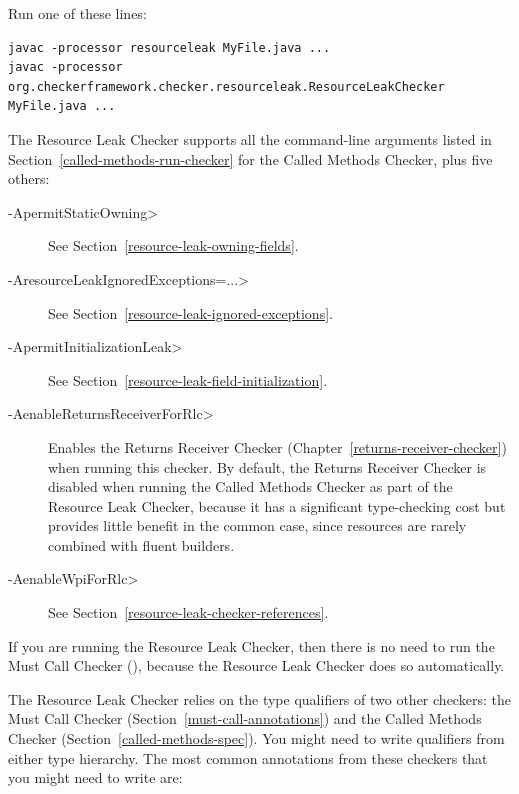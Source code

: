 
Run one of these lines:

\begin{Verbatim}
javac -processor resourceleak MyFile.java ...
javac -processor org.checkerframework.checker.resourceleak.ResourceLeakChecker MyFile.java ...
\end{Verbatim}

The Resource Leak Checker supports all the command-line arguments
listed in Section~\ref{called-methods-run-checker} for
the Called Methods Checker, plus five others:

\begin{description}
\item[\<-ApermitStaticOwning>]
  See Section~\ref{resource-leak-owning-fields}.
\item[\<-AresourceLeakIgnoredExceptions=...>]
  See Section~\ref{resource-leak-ignored-exceptions}.
\item[\<-ApermitInitializationLeak>]
  See Section~\ref{resource-leak-field-initialization}.
\item[\<-AenableReturnsReceiverForRlc>]
  Enables the Returns Receiver Checker (Chapter~\ref{returns-receiver-checker})
  when running this checker. By default, the Returns Receiver Checker is
  disabled when running the Called Methods Checker as part of the Resource Leak Checker,
  because it has a significant type-checking cost but provides little benefit in the common case,
  since resources are rarely combined with fluent builders.
\item[\<-AenableWpiForRlc>]
  See Section~\ref{resource-leak-checker-references}.
\end{description}

If you are running the Resource Leak Checker, then there is no need to run
the Must Call Checker (), because the
Resource Leak Checker does so automatically.



The Resource Leak Checker relies on the type qualifiers of two other checkers:
the Must Call Checker (Section~\ref{must-call-annotations}) and
the Called Methods Checker (Section~\ref{called-methods-spec}). You might need
to write qualifiers from either type hierarchy. The most common annotations from
these checkers that you might need to write are:

